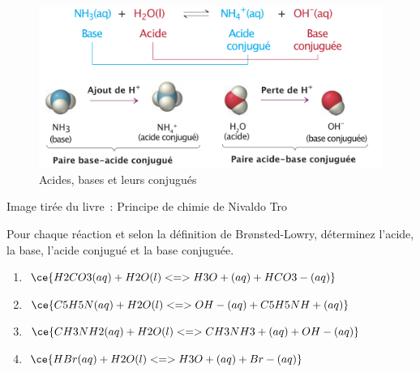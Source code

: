 \documentclass[
  11pt,
  a4paper,
  openany]{book}
\providecommand{\tightlist}{%
  \setlength{\itemsep}{0pt}\setlength{\parskip}{0pt}}
\newenvironment{credit}
  {\vspace{-2em}\begin{center}\begin{footnotesize}\begin{textit}}
  {\end{textit}\end{footnotesize}\end{center}}
\begin{document}

\begin{figure}

{\centering \includegraphics[width=0.9\linewidth]{images/acides-bases-1} 

}

\caption{Acides, bases et leurs conjugués}\label{fig:acides-bases-1}
\end{figure}

\begin{credit}
Image tirée du livre~: Principe de chimie de Nivaldo Tro

\end{credit}


\clearpage

\begin{Exercise}

Pour chaque réaction et selon la définition de Brønsted-Lowry, déterminez l'acide, la base, l'acide conjugué et la base conjuguée.

\begin{enumerate}
\def\labelenumi{\alph{enumi}.}
\tightlist
\item
  \(\ce{H2CO3(aq) + H2O(l) <=> H3O+(aq) + HCO3-(aq)}\)
\item
  \(\ce{C5H5N(aq) + H2O(l) <=> OH-(aq) + C5H5NH+(aq)}\)
\item
  \(\ce{CH3NH2(aq) + H2O(l) <=> CH3NH3+(aq) + OH-(aq)}\)
\item
  \(\ce{HBr(aq) + H2O(l) <=> H3O+(aq) + Br-(aq)}\)
\end{enumerate}

\end{Exercise}
\end{document}
